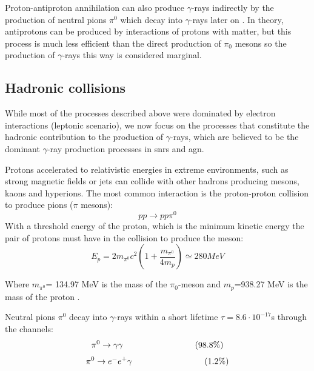 \documentclass[main.tex]{subfiles}
\begin{document}
Proton-antiproton annihilation can also produce $\gamma$-rays indirectly by the production of neutral pions $\pi^0$ which decay into $\gamma$-rays later on \cite{1967protonantiproton}. In theory, antiprotons can be produced by interactions of protons with matter, but this process is much less efficient than the direct production of $\pi_0$ mesons \cite{weekes2003HEAstrophy} so the production of $\gamma$-rays this way is considered marginal. 

\subsection{Hadronic collisions}

While most of the processes described above were dominated by electron interactions (leptonic scenario), we now focus on the processes that constitute the hadronic contribution to the production of $\gamma$-rays, which are believed to be the dominant $\gamma$-ray production processes in \glspl{snr} and \gls{agn}. 

Protons accelerated to relativistic energies in extreme environments, such as strong magnetic fields or jets can collide with other hadrons producing mesons, kaons and hyperions. The most common interaction is the proton-proton collision to produce pions ($\pi$ mesons):
\begin{equation}
    pp \rightarrow pp \pi^{0}
\end{equation}
With a threshold energy of the proton, which is the minimum kinetic energy the pair of protons must have in the collision to produce the meson:
\begin{equation}
    E_{p} = 2m_{\pi^{0}}c^{2}\left(1+\frac{m_{\pi^{0}}}{4m_{p}} \right) \simeq 280 MeV
\end{equation}

Where $m_{\pi^{0}}$= 134.97 MeV is the mass of the $\pi_{0}$-meson and $m_p$=938.27 MeV is the mass of the proton \cite{2004VHECosmicGammaRadiation}. 

Neutral pions $\pi^{0}$ decay into $\gamma$-rays within a short lifetime $\tau = 8.6 \cdot 10^{-17}$s through the channels:
\begin{equation}
    \pi^{0} \rightarrow \gamma\gamma 
    \\ \hspace{3cm}(98.8 \%)
\end{equation}
\begin{equation}
    \pi^{0} \rightarrow e^{-}e^{+}\gamma 
    \\ {}\hspace{3cm}(1.2 \%)
\end{equation}
\end{document}
